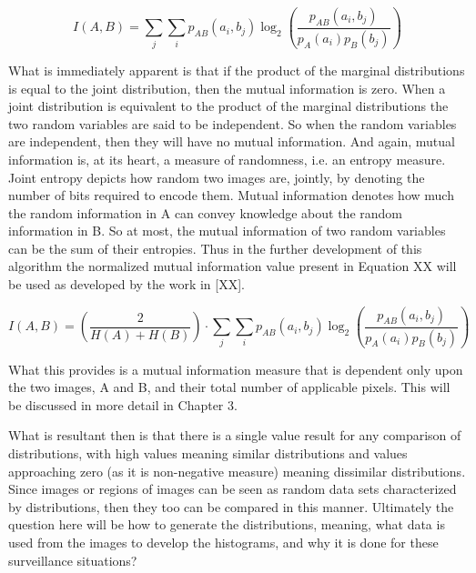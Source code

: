 \begin{equation}
\label{MutualInformation}
	I(A,B) = \sum_{j}{\sum_{i}{p_{AB}(a_{i},b_{j}) \log_{2}{\left( \frac{p_{AB}(a_{i},b_{j})}{p_{A}(a_{i})p_{B}(b_{j})}\right)}}}
\end{equation}

What is immediately apparent is that if the product of the marginal distributions is equal to the joint distribution, then the mutual information is zero. When a joint distribution is equivalent to the product of the marginal distributions the two random variables are said to be independent. So when the random variables are independent, then they will have no mutual information. And again, mutual information is, at its heart, a measure of randomness, i.e. an entropy measure. Joint entropy depicts how random two images are, jointly, by denoting the number of bits required to encode them. Mutual information denotes how much the random information in A can convey knowledge about the random information in B. So at most, the mutual information of two random variables can be the sum of their entropies. Thus in the further development of this algorithm the normalized mutual information value present in Equation XX will be used as developed by the work in [XX].

\begin{equation}
\label{NormalizedMutualInformation}
	I(A,B) = \left( \frac{2}{H(A) + H(B)}\right) \cdot \sum_{j}{\sum_{i}{p_{AB}(a_{i},b_{j}) \log_{2}{\left( \frac{p_{AB}(a_{i},b_{j})}{p_{A}(a_{i})p_{B}(b_{j})}\right)}}}
\end{equation}

What this provides is a mutual information measure that is dependent only upon the two images, A and B, and their total number of applicable pixels. This will be discussed in more detail in Chapter 3.

What is resultant then is that there is a single value result for any comparison of distributions, with high values meaning similar distributions and values approaching zero (as it is non-negative measure) meaning dissimilar distributions. Since images or regions of images can be seen as random data sets characterized by distributions, then they too can be compared in this manner. Ultimately the question here will be how to generate the distributions, meaning, what data is used from the images to develop the histograms, and why it is done for these surveillance situations?



